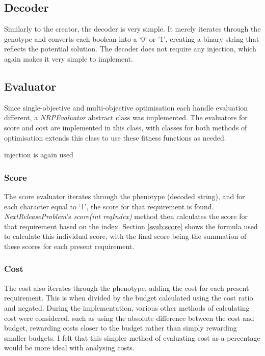 \documentclass[11pt, a4paper]{article}
\begin{document}
\subsection{Decoder} %
\label{sub:decoder}
Similarly to the creator, the decoder is very simple. It merely iterates through
the genotype and converts each boolean into a `0' or '1', creating a binary
string that reflects the potential solution. The decoder does not require any
injection, which again makes it very simple to implement.

\subsection{Evaluator} %
\label{sub:evaluator}
Since single-objective and multi-objective optimisation each handle evaluation
different, a \emph{NRPEvaluator} abstract class was implemented. The evaluators
for score and cost are implemented in this class, with classes for both methods
of optimisation extends this class to use these fitness functions as needed.

injection is again used

\subsubsection{Score} %
\label{ssub:impl_score}
The score evaluator iterates through the phenotype (decoded string), and for
each character equal to `1', the score for that requirement is found.
\emph{NextReleaseProblem}'s \emph{score(int reqIndex)} method then calculates
the score for that requirement based on the index. Section \ref{ssub:score}
shows the formula used to calculate this individual score, with the final score
being the summation of these scores for each present requirement.

\subsubsection{Cost} %
\label{ssub:impl_cost}
The cost also iterates through the phenotype, adding the cost for each present
requirement. This is when divided by the budget calculated using the cost ratio
and negated. During the implementation, various other methods of calculating
cost were considered, such as using the absolute difference between the cost and
budget, rewarding costs closer to the budget rather than simply rewarding
smaller budgets. I felt that this simpler method of evaluating cost as a
percentage would be more ideal with analysing costs.
\end{document}
